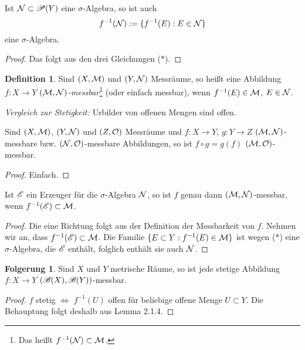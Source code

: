 \documentclass[
 a4paper,
 12pt,
 parskip=half
 ]{scrreprt}
\theoremstyle{plain}
\theoremstyle{definition}
\newtheorem{defn}[thm]{Definition}
\newtheorem{folg}[thm]{Folgerung}
\numberwithin{equation}{section}
\begin{document}
\begin{lem}
 Ist $\mathcal{N} \subset \mathscr{P}(Y)$ eine $\sigma$-Algebra, so ist auch
 \[ f^{-1}(\mathcal{N}) := \{ f^{-1}(E) : E \in \mathcal{N} \} \]
 eine $\sigma$-Algebra.
\end{lem}

\begin{proof}
 Das folgt aus den drei Gleichungen ($\ast$).
\end{proof}

\begin{defn}
 Sind $(X,\mathcal{M})$ und $(Y,\mathcal{N})$ Messräume, so heißt eine Abbildung $f: X \to Y$ \emph{$(\mathcal{M},\mathcal{N})$-messbar}\footnote{Das heißt $f^{-1}(\mathcal{N}) \subset \mathcal{M}$.} (oder einfach messbar), wenn $f^{-1}(E) \in \mathcal{M}$, $E \in \mathcal{N}$.
 
 \emph{Vergleich zur Stetigkeit:} Urbilder von offenen Mengen sind offen.
\end{defn}

\begin{lem}
 Sind $(X,\mathcal{M})$, $(Y,\mathcal{N})$ und $(Z,\mathcal{O})$ Messräume und $f:X \to Y$, $g: Y \to Z$ $(\mathcal{M},\mathcal{N})$-messbare bzw. $(\mathcal{N},\mathcal{O})$-messbare Abbildungen, so ist $f \circ g = g(f)$ $(\mathcal{M},\mathcal{O})$-messbar.
\end{lem}

\begin{proof}
 Einfach.
\end{proof}

\clearpage

\begin{lem}
 Ist $\mathscr{E}$ ein Erzeuger für die $\sigma$-Algebra $\mathcal{N}$, so ist $f$ genau dann $(\mathcal{M},\mathcal{N})$-messbar, wenn $f^{-1}(\mathscr{E}) \subset \mathcal{M}$.
\end{lem}

\begin{proof}
 Die eine Richtung folgt aus der Definition der Messbarkeit von $f$. Nehmen wir an, dass $f^{-1}(\mathscr{E}) \subset \mathcal{M}$. Die Familie $\{ E \subset Y : f^{-1}(E) \in \mathcal{M} \}$ ist wegen ($\ast$) eine $\sigma$-Algebra, die $\mathscr{E}$ enthält, folglich enthält sie auch $\mathcal{N}$.
\end{proof}

\begin{folg}
 Sind $X$ und $Y$ metrische Räume, so ist jede stetige Abbildung $f: X \to Y$ $(\mathscr{B}(X),\mathscr{B}(Y))$-messbar.
\end{folg}

\begin{proof}
 $f$ stetig $\Leftrightarrow$ $f^{-1}(U)$ offen für beliebige offene Menge $U \subset Y$. Die Behauptung folgt deshalb aus Lemma 2.1.4.
\end{proof}
\end{document}
